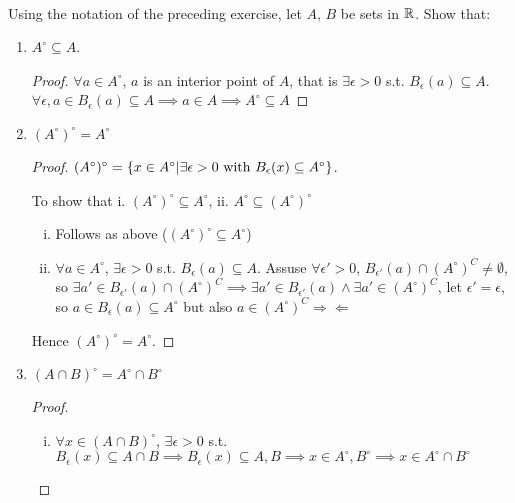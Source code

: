 \\

 Using the notation of the preceding exercise, let $A$, $B$ be sets in $\mathbb{R}$. Show that:

\begin{enumerate}
  \item $A^\circ \subseteq A$.

  \begin{proof}
    $\forall a\in A^\circ$, $a$ is an interior point of $A$, that is $\exists \epsilon > 0$ s.t. $B_\epsilon (a) \subseteq A$. $\forall \epsilon, a\in B_\epsilon (a)\subseteq A\implies a\in A\implies A^\circ \subseteq A$
  \end{proof}

  \item $(A^\circ)^\circ=A^\circ$

  \begin{proof}
    $(A^\circ)^\circ = \left\{ x\in A^\circ | \exists\epsilon > 0\text{ with }B_\epsilon (x) \subseteq A^\circ \right\}$.

    To show that i. $(A^\circ)^\circ\subseteq A^\circ$, ii. $A^\circ\subseteq (A^\circ)^\circ$

    \begin{enumerate}[i.]
      \item Follows as above ($(A^\circ)^\circ\subseteq A^\circ$)

      \item $\forall a\in A^\circ$, $\exists \epsilon > 0$ s.t. $B_\epsilon (a)\subseteq A$. Assuse $\forall \epsilon' > 0$, $B_{\epsilon'}(a)\cap (A^\circ)^C \neq \emptyset$, so $\exists a' \in B_{\epsilon'}(a)\cap (A^\circ)^C\implies \exists a' \in B_{\epsilon'}(a) \land \exists a' \in (A^\circ)^C$, let $\epsilon' = \epsilon$, so $a\in B_{\epsilon}(a)\subseteq A^\circ$ but also $a\in (A^\circ)^C \Rightarrow\!\Leftarrow$
    \end{enumerate}
    Hence $(A^\circ)^\circ=A^\circ$.
  \end{proof}

  \item $(A \cap B)^\circ = A^\circ \cap B^\circ$

  \begin{proof}
    \begin{enumerate}[i.]
      \item $\forall x \in (A \cap B)^\circ$, $\exists\epsilon > 0$ s.t. $B_\epsilon (x)\subseteq A\cap B\implies B_\epsilon (x)\subseteq A, B\implies x\in A^\circ, B^\circ\implies x\in A^\circ \cap B^\circ$


\end{enumerate}
\end{proof}
\end{enumerate}
